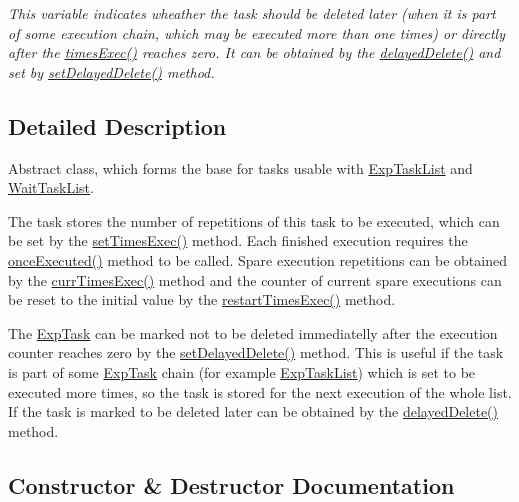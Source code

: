 \begin{DoxyCompactItemize}
\begin{DoxyCompactList}\small\item\em This variable indicates wheather the task should be deleted later (when it is part of some execution chain, which may be executed more than one times) or directly after the \hyperlink{class_exp_task_acdb19df2cfecd5c7f7d28141b062a6fe}{times\+Exec()} reaches zero. It can be obtained by the \hyperlink{class_exp_task_a440f37ee2170c077082f3d29f229be1b}{delayed\+Delete()} and set by \hyperlink{class_exp_task_a2049ca37582a4b3250f3fc46ba19fe2a}{set\+Delayed\+Delete()} method. \end{DoxyCompactList}\end{DoxyCompactItemize}


\subsection{Detailed Description}
Abstract class, which forms the base for tasks usable with \hyperlink{class_exp_task_list}{Exp\+Task\+List} and \hyperlink{class_wait_task_list}{Wait\+Task\+List}. 

The task stores the number of repetitions of this task to be executed, which can be set by the \hyperlink{class_exp_task_a9de0c990109370dea83ca471a05e1772}{set\+Times\+Exec()} method. Each finished execution requires the \hyperlink{class_exp_task_a4b1e37a956ea18764bb62b8b9ffa52d3}{once\+Executed()} method to be called. Spare execution repetitions can be obtained by the \hyperlink{class_exp_task_a1ab988b6d9eb6d61cd1b3ac1a1c42153}{curr\+Times\+Exec()} method and the counter of current spare executions can be reset to the initial value by the \hyperlink{class_exp_task_ac84290f4ee014237657794522350cfea}{restart\+Times\+Exec()} method.

The \hyperlink{class_exp_task}{Exp\+Task} can be marked not to be deleted immediatelly after the execution counter reaches zero by the \hyperlink{class_exp_task_a2049ca37582a4b3250f3fc46ba19fe2a}{set\+Delayed\+Delete()} method. This is useful if the task is part of some \hyperlink{class_exp_task}{Exp\+Task} chain (for example \hyperlink{class_exp_task_list}{Exp\+Task\+List}) which is set to be executed more times, so the task is stored for the next execution of the whole list. If the task is marked to be deleted later can be obtained by the \hyperlink{class_exp_task_a440f37ee2170c077082f3d29f229be1b}{delayed\+Delete()} method. 

\subsection{Constructor \& Destructor Documentation}
\hypertarget{class_exp_task_ab741ec0a236695211f2b772881ae756c}{}

